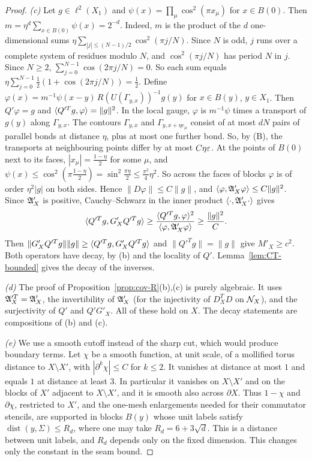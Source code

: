 \begin{proof}
\emph{(c)} Let $g\in\ell^2(X_1)$ and $\psi(x)=\prod_\mu\cos^2(\pi x_\mu)$ for $x\in B(0)$. Then $m=\eta^d\sum_{x\in B(0)}\psi(x)=2^{-d}$. Indeed, $m$ is the product of the $d$ one-dimensional sums $\eta\sum_{|j|\le(N-1)/2}\cos^2(\pi j/N)$. Since $N$ is odd, $j$ runs over a complete system of residues modulo $N$, and $\cos^2(\pi j/N)$ has period $N$ in $j$. Since $N\ge2$, $\sum_{j=0}^{N-1}\cos(2\pi j/N)=0$. So each sum equals $\eta\sum_{j=0}^{N-1}\frac12(1+\cos(2\pi j/N))=\frac12$. Define $\varphi(x)=m^{-1}\psi(x-y)\,R(U(\Gamma_{y,x}))^{-1}g(y)$ for $x\in B(y)$, $y\in X_1$. Then $Q'\varphi=g$ and $\langle Q'^Tg,\varphi\rangle=\|g\|^2$. In the local gauge, $\varphi$ is $m^{-1}\psi$ times a transport of $g(y)$ along $\Gamma_{y,x}$. The contours $\Gamma_{y,x}$ and $\Gamma_{y,x+\eta e_\mu}$ consist of at most $dN$ pairs of parallel bonds at distance $\eta$, plus at most one further bond. So, by (B), the transports at neighbouring points differ by at most $C\eta\varepsilon$. At the points of $B(0)$ next to its faces, $|x_\mu|=\frac{1-\eta}2$ for some $\mu$, and $\psi(x)\le\cos^2(\pi\frac{1-\eta}2)=\sin^2\frac{\pi\eta}2\le\frac{\pi^2}4\eta^2$. So across the faces of blocks $\varphi$ is of order $\eta^2|g|$ on both sides. Hence $\|D\varphi\|\le C\|g\|$, and $\langle \varphi,\mathfrak A'_X\varphi\rangle\le C\|g\|^2$. Since $\mathfrak A'_X$ is positive, Cauchy--Schwarz in the inner product $\langle \cdot,\mathfrak A'_X\cdot\rangle$ gives
\[
\langle Q'^Tg,G'_XQ'^Tg\rangle\ge\frac{\langle Q'^Tg,\varphi\rangle^2}{\langle \varphi,\mathfrak A'_X\varphi\rangle}\ge\frac{\|g\|^2}C .
\]
Then $\|G'_XQ'^Tg\|\|g\|\ge\langle Q'^Tg,G'_XQ'^Tg\rangle$ and $\|Q'^Tg\|=\|g\|$ give $M'_X\ge c^2$. Both operators have decay, by (b) and the locality of $Q'$. Lemma~\ref{lem:CT-bounded} gives the decay of the inverses.

\emph{(d)} The proof of Proposition~\ref{prop:cov-R}(b),(c) is purely algebraic. It uses $\mathfrak A'^T_X=\mathfrak A'_X$, the invertibility of $\mathfrak A'_X$ (for the injectivity of $D^T_XD$ on $\mathcal N_X$), and the surjectivity of $Q'$ and $Q'G'_X$. All of these hold on $X$. The decay statements are compositions of (b) and (c).

\emph{(e)} We use a smooth cutoff instead of the sharp cut, which would produce boundary terms. Let $\chi$ be a smooth function, at unit scale, of a mollified torus distance to $X\setminus X'$, with $|\partial^k\chi|\le C$ for $k\le2$. It vanishes at distance at most $1$ and equals $1$ at distance at least $3$. In particular it vanishes on $X\setminus X'$ and on the blocks of $X'$ adjacent to $X\setminus X'$, and it is smooth also across $\partial X$. Thus $1-\chi$ and $\partial\chi$, restricted to $X'$, and the one-mesh enlargements needed for their commutator stencils, are supported in blocks $B(y)$ whose unit labels satisfy $\operatorname{dist}(y,\Sigma)\le R_d$, where one may take $R_d=6+3\sqrt d$. This is a distance between unit labels, and $R_d$ depends only on the fixed dimension. This changes only the constant in the seam bound.


\end{proof}
